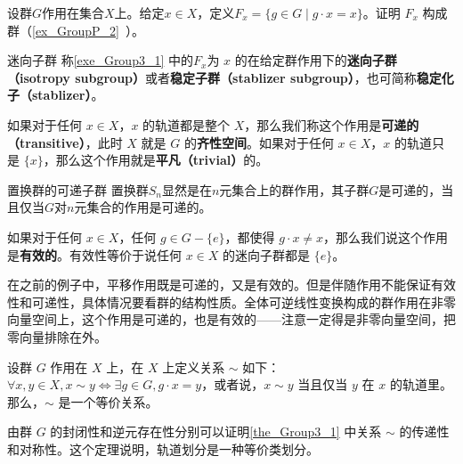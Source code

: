 \begin{exercise}{}\label{exe_Group3_1}
设群$G$作用在集合$X$上。给定$x\in X$，定义$F_x=\{g\in G\mid g\cdot x=x\}$。证明 $F_x$ 构成群（\autoref{ex_GroupP_2}~）。
\end{exercise}




\begin{definition}{迷向子群}
称\autoref{exe_Group3_1} 中的$F_x$为 $x$ 的在给定群作用下的\textbf{迷向子群（isotropy subgroup）}或者\textbf{稳定子群（stablizer subgroup）}，也可简称\textbf{稳定化子（stablizer）}。
\end{definition}






\begin{definition}{}
如果对于任何 $x\in X$，$x$ 的轨道都是整个 $X$，那么我们称这个作用是\textbf{可递的（transitive）}，此时 $X$ 就是 $G$ 的\textbf{齐性空间}。如果对于任何 $x\in X$，$x$ 的轨道只是 $\{x\}$，那么这个作用就是\textbf{平凡（trivial）}的。
\end{definition}

\begin{example}{置换群的可递子群}\label{ex_Group3_4}
置换群$S_n$显然是在$n$元集合上的群作用，其子群$G$是可递的，当且仅当$G$对$n$元集合的作用是可递的。
\end{example}

如果对于任何 $x\in X$，任何 $g\in G-\{e\}$，都使得 $g\cdot x\not=x$，那么我们说这个作用是\textbf{有效的}。有效性等价于说任何 $x\in X$ 的迷向子群都是 $\{e\}$。

在之前的例子中，平移作用既是可递的，又是有效的。但是伴随作用不能保证有效性和可递性，具体情况要看群的结构性质。全体可逆线性变换构成的群作用在非零向量空间上，这个作用是可递的，也是有效的——注意一定得是非零向量空间，把零向量排除在外。

\begin{theorem}{}\label{the_Group3_1}
设群 $G$ 作用在 $X$ 上，在 $X$ 上定义关系 $\sim$ 如下：$\forall x, y\in X, x\sim y \iff \exists g\in G, g\cdot x=y$，或者说，$x\sim y$ 当且仅当 $y$ 在 $x$ 的轨道里。那么，$\sim$ 是一个等价关系。
\end{theorem}

由群 $G$ 的封闭性和逆元存在性分别可以证明\autoref{the_Group3_1} 中关系 $\sim$ 的传递性和对称性。这个定理说明，轨道划分是一种等价类划分。






